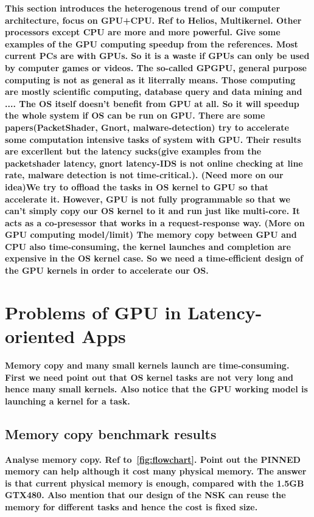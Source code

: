\documentclass[letterpaper,twocolumn,10pt]{article}
\begin{document}
{\color{red} \textbf{This section introduces the heterogenous trend of our computer architecture, focus on GPU+CPU. Ref to Helios, Multikernel. Other processors except CPU are more and more powerful. Give some examples of the GPU computing speedup from the references. Most current PCs are with GPUs. So it is a waste if GPUs can only be used by computer games or videos. The so-called GPGPU, general purpose computing is not as general as it literrally means. Those computing are mostly scientific computing, database query and data mining and .... The OS itself doesn't benefit from GPU at all. So it will speedup the whole system if OS can be run on GPU. There are some papers(PacketShader, Gnort, malware-detection) try to accelerate some computation intensive tasks of system with GPU. Their results are excerllent but the latency sucks(give examples from the packetshader latency, gnort latency-IDS is not online checking at line rate, malware detection is not time-critical.). (Need more on our idea)We try to offload the tasks in OS kernel to GPU so that accelerate it. However, GPU is not fully programmable so that we can't simply copy our OS kernel to it and run just like multi-core. It acts as a co-presessor that works in a request-response way. (More on GPU computing model/limit) The memory copy between GPU and CPU also time-consuming, the kernel launches and completion are expensive in the OS kernel case. So we need a time-efficient design of the GPU kernels in order to accelerate our OS. } }

\section{Problems of GPU in Latency-oriented Apps}

{\color{red} \textbf{ Memory copy and many small kernels launch are time-consuming. First we need point out that OS kernel tasks are not very long and hence many small kernels. Also notice that the GPU working model is launching a kernel for a task. } }


\subsection{Memory copy benchmark results}

{\color{red} \textbf{Analyse memory copy. Ref to~\ref{fig:flowchart}. Point out the PINNED memory can help although it cost many physical memory. The answer is that current physical memory is enough, compared with the 1.5GB GTX480. Also mention that our design of the NSK can reuse the memory for different tasks and hence the cost is fixed size. } }
\end{document}
